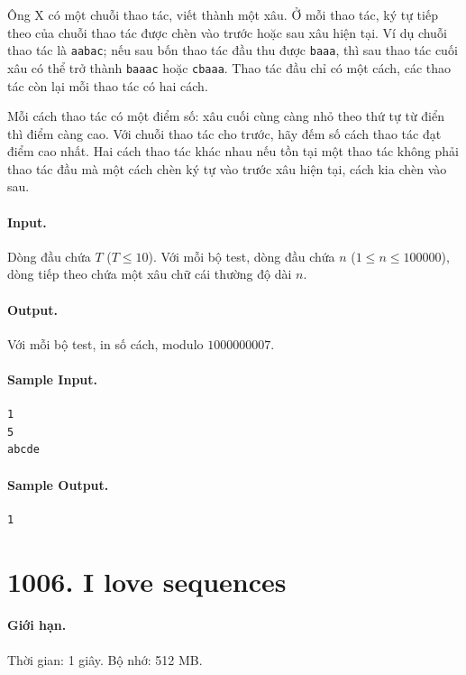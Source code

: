 \documentclass[11pt]{article}
\begin{document}
Ông X có một chuỗi thao tác, viết thành một xâu.  Ở mỗi thao tác, ký tự tiếp
theo của chuỗi thao tác được chèn vào trước hoặc sau xâu hiện tại.  Ví dụ chuỗi
thao tác là \texttt{aabac}; nếu sau bốn thao tác đầu thu được \texttt{baaa},
thì sau thao tác cuối xâu có thể trở thành \texttt{baaac} hoặc \texttt{cbaaa}.
Thao tác đầu chỉ có một cách, các thao tác còn lại mỗi thao tác có hai cách.

Mỗi cách thao tác có một điểm số: xâu cuối cùng càng nhỏ theo thứ tự từ điển
thì điểm càng cao.  Với chuỗi thao tác cho trước, hãy đếm số cách thao tác đạt
điểm cao nhất.  Hai cách thao tác khác nhau nếu tồn tại một thao tác không phải
thao tác đầu mà một cách chèn ký tự vào trước xâu hiện tại, cách kia chèn vào
sau.

\paragraph{Input.}
Dòng đầu chứa $T$ ($T\le 10$).  Với mỗi bộ test, dòng đầu chứa $n$
($1\le n\le 100000$), dòng tiếp theo chứa một xâu chữ cái thường độ dài $n$.

\paragraph{Output.}
Với mỗi bộ test, in số cách, modulo $1000000007$.

\paragraph{Sample Input.}
\begin{verbatim}
1
5
abcde
\end{verbatim}

\paragraph{Sample Output.}
\begin{verbatim}
1
\end{verbatim}

\section{1006. I love sequences}

\paragraph{Giới hạn.} Thời gian: 1 giây. Bộ nhớ: 512 MB.
\end{document}
